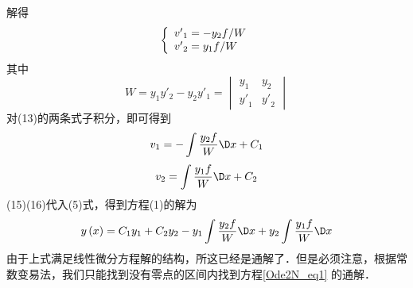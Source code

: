 解得
\begin{equation}
\left\{ \begin{array}{l}
{{v'}_1} =  - {{{y_2}f} \mathord{\left/
 {\vphantom {{{y_2}f} W}} \right.
 \kern-\nulldelimiterspace} W}\\
{{v'}_2} = {{{y_1}f} \mathord{\left/
 {\vphantom {{{y_1}f} W}} \right.
 \kern-\nulldelimiterspace} W}
\end{array} \right.
\end{equation}
其中
\begin{equation}
W = {y_1}{y'_2} - {y_2}{y'_1} = 
\begin{vmatrix}
{{y_1}}&{{y_2}}\\
{{{y'}_1}}&{{{y'}_2}}
\end{vmatrix}
\end{equation}
对(13)的两条式子积分，即可得到
\[{v_1} =  - \int {\frac{{{y_2}f}}{W}\D x}  + {C_1}\]
\[{v_2} = \int {\frac{{{y_1}f}}{W}\D x}  + {C_2}\]
(15)(16)代入(5)式，得到方程(1)的解为
\[y\left( x \right) = {C_1}{y_1} + {C_2}{y_2} - {y_1}\int {\frac{{{y_2}f}}{W}\D x + {y_2}\int {\frac{{{y_1}f}}{W}\D x} } \]
由于上式满足线性微分方程解的结构，所这已经是通解了．但是必须注意，根据常数变易法，我们只能找到没有零点的区间内找到方程\autoref{Ode2N_eq1} 的通解．

